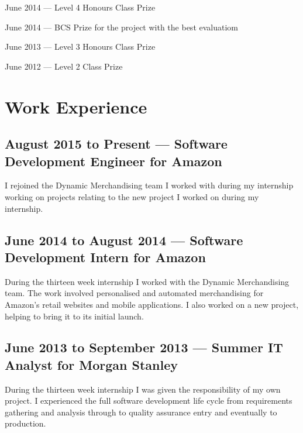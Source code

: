 \documentclass[11pt,a4paper]{article}
\begin{document}
June 2014 --- Level 4 Honours Class Prize

June 2014 --- BCS Prize for the project with the best evaluatiom

June 2013 --- Level 3 Honours Class Prize

June 2012 --- Level 2 Class Prize

\section*{Work Experience}

\subsection*{August 2015 to Present --- Software Development Engineer for Amazon}

I rejoined the Dynamic Merchandising team I worked with during my internship
working on projects relating to the new project I worked on during my
internship.

\subsection*{June 2014 to August 2014 --- Software Development Intern for Amazon}

During the thirteen week internship I worked with the Dynamic Merchandising
team. The work involved personalised and automated merchandising for Amazon's
retail websites and mobile applications. I also worked on a new project, helping
to bring it to its initial launch.

\subsection*{June 2013 to September 2013 --- Summer IT Analyst for Morgan Stanley}

During the thirteen week internship I was given the responsibility of my own
project. I experienced the full software development life cycle from
requirements gathering and analysis through to quality assurance entry and
eventually to production.
\end{document}
